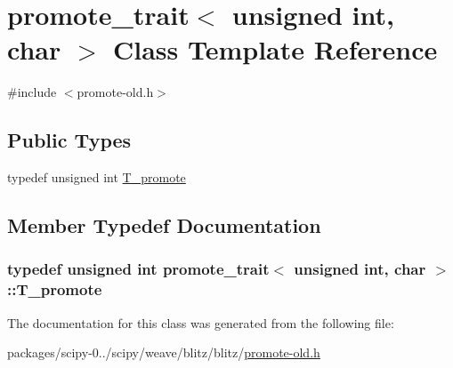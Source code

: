 \hypertarget{classpromote__trait_3_01unsigned_01int_00_01char_01_4}{}\section{promote\+\_\+trait$<$ unsigned int, char $>$ Class Template Reference}
\label{classpromote__trait_3_01unsigned_01int_00_01char_01_4}


{\ttfamily \#include $<$promote-\/old.\+h$>$}

\subsection*{Public Types}
\begin{DoxyCompactItemize}
\item 
typedef unsigned int \hyperlink{classpromote__trait_3_01unsigned_01int_00_01char_01_4_a60443e9f749cb5d76d41d72c5ccd660b}{T\+\_\+promote}
\end{DoxyCompactItemize}


\subsection{Member Typedef Documentation}
\hypertarget{classpromote__trait_3_01unsigned_01int_00_01char_01_4_a60443e9f749cb5d76d41d72c5ccd660b}{}
\subsubsection[{T\+\_\+promote}]{\setlength{\rightskip}{0pt plus 5cm}typedef unsigned int {\bf promote\+\_\+trait}$<$ unsigned int, char $>$\+::{\bf T\+\_\+promote}}\label{classpromote__trait_3_01unsigned_01int_00_01char_01_4_a60443e9f749cb5d76d41d72c5ccd660b}


The documentation for this class was generated from the following file\+:\begin{DoxyCompactItemize}
\item 
packages/scipy-\/0../scipy/weave/blitz/blitz/\hyperlink{promote-old_8h}{promote-\/old.\+h}\end{DoxyCompactItemize}
